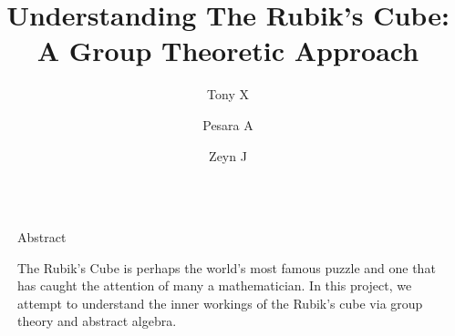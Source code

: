 \documentclass[final]{beamer}
\title{Understanding The Rubik's Cube: A Group Theoretic Approach}
\author{Tony X \and Pesara A  \and Zeyn J}
\newlength{\sepwidth}
\newlength{\colwidth}
\newcommand{\separatorcolumn}{\begin{column}{\sepwidth}\end{column}}
\begin{document}
\pgfmathsetmacro{}
\newcommand{\frontcolor}{red}
\newcommand{\sidecolor}{blue}
\begin{frame}[t]
\begin{columns}[t]
\separatorcolumn

\begin{column}{\colwidth}

  \begin{block}{Abstract}



    The Rubik's Cube is perhaps the world's most famous puzzle and one that has caught the attention of many a mathematician. 
    In this project, we attempt to understand the inner workings of the Rubik's cube via group theory and abstract algebra. 


\end{block}
\end{column}
\end{columns}
\end{frame}
\end{document}
